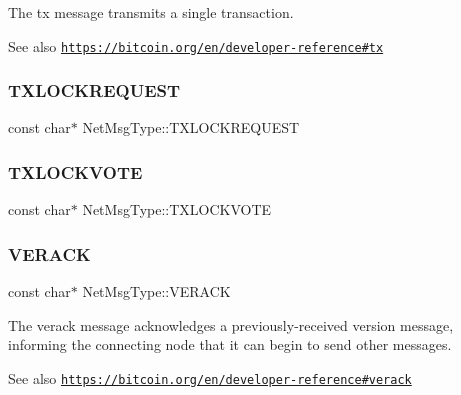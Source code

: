 The tx message transmits a single transaction. \begin{DoxySeeAlso}{See also}
\href{https://bitcoin.org/en/developer-reference#tx}{\tt https\+://bitcoin.\+org/en/developer-\/reference\#tx} 
\end{DoxySeeAlso}
\mbox{\label{namespace_net_msg_type_afc8f3eaef85dec53f3c0b247a4caa7e6}} 
\subsubsection{\texorpdfstring{T\+X\+L\+O\+C\+K\+R\+E\+Q\+U\+E\+ST}{TXLOCKREQUEST}}
{\footnotesize\ttfamily const char$\ast$ Net\+Msg\+Type\+::\+T\+X\+L\+O\+C\+K\+R\+E\+Q\+U\+E\+ST}

\mbox{\label{namespace_net_msg_type_aae54808e52ee4282c67808da8f8ea5ec}} 
\subsubsection{\texorpdfstring{T\+X\+L\+O\+C\+K\+V\+O\+TE}{TXLOCKVOTE}}
{\footnotesize\ttfamily const char$\ast$ Net\+Msg\+Type\+::\+T\+X\+L\+O\+C\+K\+V\+O\+TE}

\mbox{\label{namespace_net_msg_type_ae68c925ef721cf9251cf111f72b21c3f}} 
\subsubsection{\texorpdfstring{V\+E\+R\+A\+CK}{VERACK}}
{\footnotesize\ttfamily const char$\ast$ Net\+Msg\+Type\+::\+V\+E\+R\+A\+CK}

The verack message acknowledges a previously-\/received version message, informing the connecting node that it can begin to send other messages. \begin{DoxySeeAlso}{See also}
\href{https://bitcoin.org/en/developer-reference#verack}{\tt https\+://bitcoin.\+org/en/developer-\/reference\#verack} 
\end{DoxySeeAlso}
\mbox{\label{namespace_net_msg_type_a63563d95182b273387cd84a75c52832b}} 
